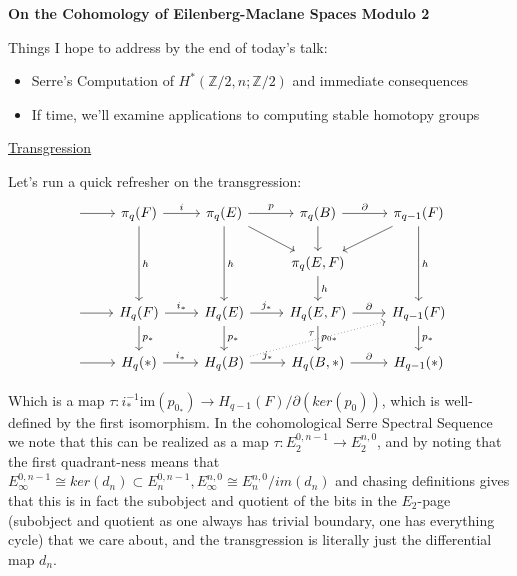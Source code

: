 \documentclass{article}
\newcommand{\bb}[1]{\mathbb{#1}}
\newcommand{\bb}[1]{\mathbb{#1}}
\begin{document}
\begin{center}
  \Huge \textbf{On the Cohomology of Eilenberg-Maclane Spaces Modulo 2}
\end{center}

\vspace{0.2in}
Things I hope to address by the end of today's talk:
\begin{itemize}
\item Serre's Computation of $H^{*}(\bb{Z}/2, n ; \bb{Z}/2)$ and immediate consequences
\item If time, we'll examine applications to computing stable homotopy groups 
\end{itemize}

\underline{Transgression}

Let's run a quick refresher on the transgression:
\[
\begin{tikzcd}
 \arrow[r] & \pi_{q}(F) \arrow[dd, "h"] \arrow[r, "i"]      & \pi_{q}(E) \arrow[r, "p"] \arrow[rd] \arrow[dd, "h"]    & \pi_{q}(B) \arrow[r, "\partial"] \arrow[d]                     & \pi_{q-1}(F) \arrow[dd, "h"] \arrow[ld] \\
           &                                                &                                                         & {\pi_{q}(E,F)} \arrow[d, "h"]                           &                                         \\
 \arrow[r] & H_{q}(F) \arrow[r, "i_{*}"] \arrow[d, "p_{*}"] & H_{q}(E) \arrow[r, "j_{*}"] \arrow[d, "p_{*}"]          & {H_{q}(E,F)} \arrow[r, "\partial"] \arrow[d, "p_{0 *}"] & H_{q-1}(F) \arrow[d, "p_{*}"]           \\
 \arrow[r] & H_{q}(*) \arrow[r, "i_{*}"]                    & H_{q}(B) \arrow[r, "j_{*}"] \arrow[rru, "\tau", dotted] & {H_{q}(B,*)} \arrow[r, "\partial"]                      & H_{q-1}(*)                             
\end{tikzcd}
\]

Which is a map $\tau: i_{*}^{-1}\text{im}(p_{0}_{{*}}) \to H_{q-1}(F)/\partial(ker (p_{{0}}))$, which is well-defined by the first isomorphism. In the cohomological Serre Spectral Sequence we note that this can be realized as a map $\tau: E^{0,n-1}_{2} \to E^{n,0}_{2}$, and by noting that the first quadrant-ness means that $E_{\infty}^{0,n-1} \cong ker(d_{n})\subset E_{n}^{0,n-1}, E_{\infty}^{n,0} \cong E_{n}^{n,0}/im(d_{n})$ and chasing definitions gives that this is in fact the subobject and quotient of the bits in the $E_{2}$-page (subobject and quotient as one always has trivial boundary, one has everything cycle) that we care about, and the transgression is literally just the differential map $d_{n}$.
\\
\end{document}
